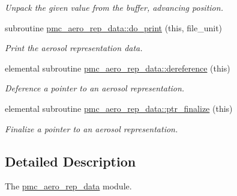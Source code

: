 \begin{DoxyCompactItemize}
\begin{DoxyCompactList}\small\item\em Unpack the given value from the buffer, advancing position. \end{DoxyCompactList}\item 
subroutine \mbox{\hyperlink{namespacepmc__aero__rep__data_a31a32f41ba259b6eef1636b933353001}{pmc\+\_\+aero\+\_\+rep\+\_\+data\+::do\+\_\+print}} (this, file\+\_\+unit)
\begin{DoxyCompactList}\small\item\em Print the aerosol representation data. \end{DoxyCompactList}\item 
elemental subroutine \mbox{\hyperlink{namespacepmc__aero__rep__data_a2a93c7441f280e77157ef15b4e30574b}{pmc\+\_\+aero\+\_\+rep\+\_\+data\+::dereference}} (this)
\begin{DoxyCompactList}\small\item\em Deference a pointer to an aerosol representation. \end{DoxyCompactList}\item 
elemental subroutine \mbox{\hyperlink{namespacepmc__aero__rep__data_a6a187513dbaf6fe2bee7870e43778020}{pmc\+\_\+aero\+\_\+rep\+\_\+data\+::ptr\+\_\+finalize}} (this)
\begin{DoxyCompactList}\small\item\em Finalize a pointer to an aerosol representation. \end{DoxyCompactList}\end{DoxyCompactItemize}


\subsection{Detailed Description}
The \mbox{\hyperlink{namespacepmc__aero__rep__data}{pmc\+\_\+aero\+\_\+rep\+\_\+data}} module. 

